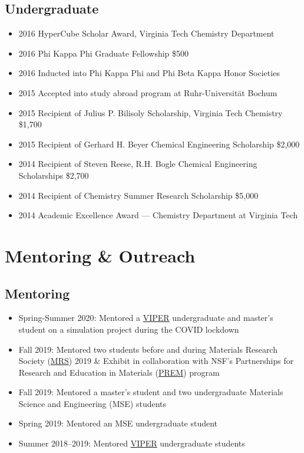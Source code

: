 \documentclass[11pt]{article} %
\begin{document}
\subsection*{Undergraduate}
\begin{itemize}
  \item 2016 HyperCube Scholar Award, Virginia Tech Chemistry Department
  \item 2016 Phi Kappa Phi Graduate Fellowship \hfill \$500
  \item 2016 Inducted into Phi Kappa Phi and Phi Beta Kappa Honor Societies
  \item 2015 Accepted into study abroad program at Ruhr-Universität Bochum
  \item 2015 Recipient of Julius P. Bilisoly Scholarship, Virginia Tech Chemistry \hfill \$1,700
  \item 2015 Recipient of Gerhard H. Beyer Chemical Engineering Scholarship \hfill \$2,000
  \item 2014 Recipient of Steven Reese, R.H. Bogle Chemical Engineering Scholarships \hfill \$2,700
  \item 2014 Recipient of Chemistry Summer Research Scholarship \hfill \$5,000
  \item 2014 Academic Excellence Award --- Chemistry Department at Virginia Tech
\end{itemize}

\section{Mentoring \& Outreach}
\subsection{Mentoring}
\begin{itemize}
  \item Spring-Summer 2020: Mentored a \href{https://www.viper.upenn.edu/}{VIPER} undergraduate and master's student on a simulation project during the COVID lockdown
  \item Fall 2019: Mentored two students before and during Materials Research Society (\href{https://www.mrs.org/}{MRS}) 2019 \& Exhibit in collaboration with NSF's Partnerships for Research and Education in Materials (\href{https://new.nsf.gov/funding/opportunities/prem-partnerships-research-education-materials}{PREM}) program
  \item Fall 2019: Mentored a master's student and two undergraduate Materials Science and Engineering (MSE) students
  \item Spring 2019: Mentored an MSE undergraduate student
  \item Summer 2018--2019: Mentored \href{https://www.viper.upenn.edu/}{VIPER} undergraduate students
\end{itemize}
\end{document}
